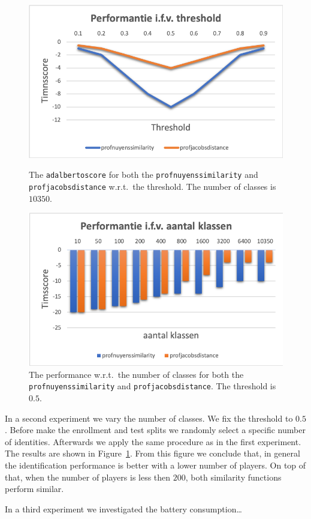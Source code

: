 \documentclass[a4paper,11pt]{article}
\begin{document}
{\begin{figure}
\centering
\begin{minipage}[b]{.43\textwidth}
	\includegraphics[width=\linewidth]{figures/performance}
	\caption{The \texttt{adalbertoscore} for both the \texttt{profnuyenssimilarity} and \texttt{profjacobsdistance} w.r.t.\ the threshold. The number of classes is $10350$.} 
	\label{fig:performance}
\end{minipage}
\hspace{1cm}
\begin{minipage}[b]{.43\textwidth}
	\includegraphics[width=\linewidth]{figures/performanceClasses}
	\caption{The performance w.r.t.\ the number of classes for both the \texttt{profnuyenssimilarity} and \texttt{profjacobsdistance}. The threshold is $0.5$.} 
	\label{fig:performanceClasses}
\end{minipage}
\end{figure}

In a second experiment we vary the number of classes. We fix the threshold to $0.5$. Before make the enrollment and test splits we randomly select a specific number of identities. Afterwards we apply the same procedure as in the first experiment. The results are shown in Figure~\ref{fig:performanceClasses}. From this figure we conclude that, in general the identification performance is better with a lower number of players. On top of that, when the number of players is less then $200$, both similarity functions perform similar.

In a third experiment we investigated the battery consumption\ldots
}
\end{document}
